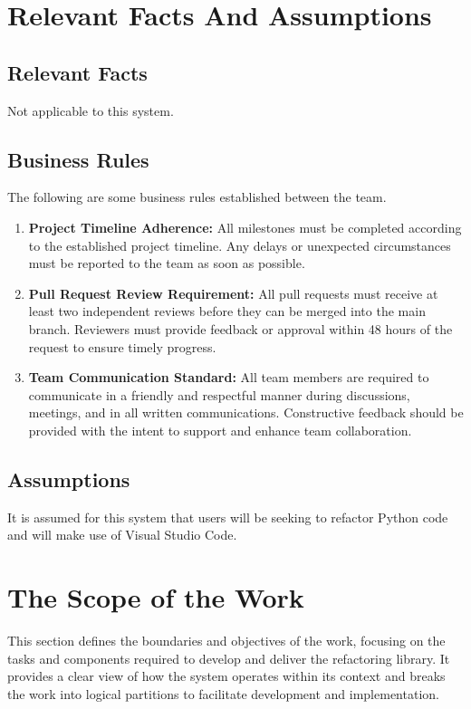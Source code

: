 \documentclass[12pt]{article}
\begin{document}
\section{Relevant Facts And Assumptions}
\subsection{Relevant Facts}
Not applicable to this system.
\subsection{Business Rules}

The following are some business rules established between the team.

\begin{enumerate}
  \item \textbf{Project Timeline Adherence:} All milestones must be completed according to the established project timeline. Any delays or unexpected circumstances must be reported to the team as soon as possible.
  \item \textbf{Pull Request Review Requirement:} All pull requests must receive at least two independent reviews before they can be merged into the main branch. Reviewers must provide feedback or approval within 48 hours of the request to ensure timely progress.
  \item \textbf{Team Communication Standard:} All team members are required to communicate in a friendly and respectful manner during discussions, meetings, and in all written communications. Constructive feedback should be provided with the intent to support and enhance team collaboration.
\end{enumerate}


\subsection{Assumptions}
It is assumed for this system that users will be seeking to refactor Python code and will make use of Visual Studio Code.

\section{The Scope of the Work}
This section defines the boundaries and objectives of the work, focusing on the tasks and components required to develop and deliver the refactoring library. It provides a clear view of how the system operates within its context and breaks the work into logical partitions to facilitate development and implementation.
\end{document}
